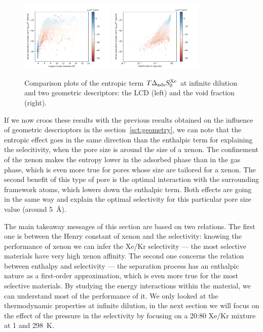 \documentclass[main.tex]{subfiles}
\begin{document}
\begin{figure}
  \centering
  \includegraphics[width=0.4\textwidth]{figures/2-thermo/Scatterplot_entropy_lcd.pdf}
  \includegraphics[width=0.4\textwidth]{figures/2-thermo/Scatterplot_entropy_vf.pdf}
  \caption{Comparison plots of the entropic term $T\Delta_{\text{ads}}S^{\text{Xe}}_{\text{0}}$ at infinite dilution and two geometric descriptors: the LCD (left) and the void fraction (right).}\label{fgr:entropy_geometry}
\end{figure}

If we now croos these results with the previous results obtained on the influence of geometric descrioptors in the section~\ref{sct:geometry}, we can note that the entropic effect goes in the same direction than the enthalpic term for explaining the selecitivity, when the pore size is around the size of a xenon. The confinement of the xenon makes the entropy lower in the adsorbed phase than in the gas phase, which is even more true for pores whose size are tailored for a xenon. The second benefit of this type of pore is the optimal interaction with the surrounding framework atoms, which lowers down the enthalpic term. Both effects are going in the same way and explain the optimal selectivity for this particular pore size value (around \SI{5}{\angstrom}). 

The main takeaway messages of this section are based on two relations. The first one is between the Henry constant of xenon and the selectivity: knowing the performance of xenon we can infer the Xe/Kr selectivity --- the most selective materials have very high xenon affinity. The second one concerns the relation between enthalpy and selectivity --- the separation process has an enthalpic nature as a first-order approximation, which is even more true for the most selective materials. By studying the energy interactions within the material, we can understand most of the performance of it. We only looked at the thermodynamic properties at infinite dilution, in the next section we will focus on the effect of the pressure in the selectivity by focusing on a 20:80 Xe/Kr mixture at \SI{1}{\atm} and \SI{298}{\kelvin}. 
\end{document}
